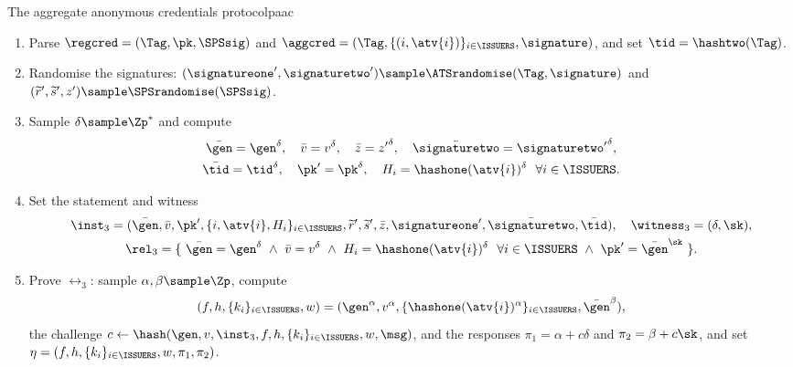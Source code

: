 \begin{protocolbox}{The aggregate anonymous credentials protocol}{paac}
\begin{description}
      \begin{enumerate}

	\item Parse $\regcred = (\Tag,\pk,\SPSsig)$ and $\aggcred =
(\Tag,\{(i, \atv{i})\}_{i \in \ISSUERS},\signature)$, and set $\tid =
\hashtwo(\Tag)$.

	\item Randomise the signatures: $(\signatureone', \signaturetwo')
\sample \ATSrandomise(\Tag,\signature)$ and $(\widetilde{r}', \widetilde{s}',
z') \sample \SPSrandomise(\SPSsig)$.

	\item Sample $\delta \sample \Zp^*$ and compute
	  \begin{gather*}
	    \bar{\gen} = \gen^\delta, \quad \bar{v} = v^\delta, \quad \bar{z} =
{z'}^\delta, \quad \bar{\signaturetwo} = {\signaturetwo'}^\delta, \\
\bar{\tid} = \tid^\delta, \quad \pk' = \pk^\delta, \quad H_i =
\hashone(\atv{i})^\delta \ \ \forall i \in \ISSUERS.
	  \end{gather*}

	\item Set the statement and witness
	  \begin{equation*}\begin{gathered}
	    \inst_3 = (\bar{\gen}, \bar{v}, \pk', \{i, \atv{i}, H_i\}_{i\in\ISSUERS},
\widetilde{r}', \widetilde{s}', \bar{z}, \signatureone', \bar{\signaturetwo},
\bar{\tid}), \quad \witness_3 = (\delta, \sk), \\
	    \rel_3 = \{\ \bar{\gen} = \gen^\delta \ \wedge\ \bar{v} = v^\delta \
\wedge\ H_i = \hashone(\atv{i})^\delta\ \ \forall i \in \ISSUERS \ \wedge\ \pk'
= \bar{\gen}^\sk\ \}.
	\end{gathered}\end{equation*}

      \item Prove $\rel_3$: sample $\alpha, \beta \sample \Zp$, compute
	  \begin{equation*}
	    (f, h, \{k_i\}_{i \in \ISSUERS}, w) = (\gen^\alpha, v^\alpha,
\{\hashone(\atv{i})^\alpha\}_{i \in \ISSUERS}, \bar{\gen}^\beta),
	  \end{equation*}
	the challenge $c \leftarrow \hash(\gen, v, \inst_3, f, h, \{k_i\}_{i \in
\ISSUERS}, w, \msg)$, and the responses $\pi_1 = \alpha + c\delta$ and $\pi_2 =
\beta + c\sk$, and set $\eta = (f, h, \{k_i\}_{i \in \ISSUERS}, w, \pi_1,
\pi_2)$.


\end{enumerate}
\end{description}
\end{protocolbox}
